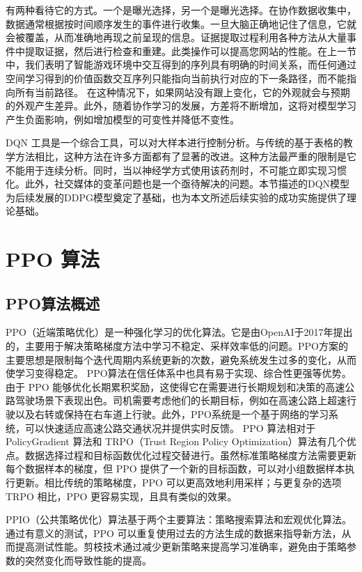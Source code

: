 有两种看待它的方式。一个是曝光选择，另一个是曝光选择。在协作数据收集中，数据通常根据按时间顺序发生的事件进行收集。一旦大脑正确地记住了信息，它就会被覆盖，从而准确地再现之前呈现的信息。证据提取过程利用各种方法从大量事件中提取证据，然后进行检查和重建。此类操作可以提高您网站的性能。在上一节中，我们表明了智能游戏环境中交互得到的序列具有明确的时间关系，而任何通过空间学习得到的价值函数交互序列只能指向当前执行对应的下一条路径，而不能指向所有当前路径。
在这种情况下，如果网站没有跟上变化，它的外观就会与预期的外观产生差异。此外，随着协作学习的发展，方差将不断增加，这将对模型学习产生负面影响，例如增加模型的可变性并降低不变性。

DQN 工具是一个综合工具，可以对大样本进行控制分析。与传统的基于表格的教学方法相比，这种方法在许多方面都有了显著的改进。这种方法最严重的限制是它不能用于连续分析。同时，当以神经学方式使用该药剂时，不可能立即实现习惯化。此外，社交媒体的变革问题也是一个亟待解决的问题。本节描述的DQN模型为后续发展的DDPG模型奠定了基础，也为本文所述后续实验的成功实施提供了理论基础。

\section{PPO 算法}

\subsection{PPO算法概述 }

PPO（近端策略优化）是一种强化学习的优化算法。它是由OpenAI于2017年提出的，主要用于解决策略梯度方法中学习不稳定、采样效率低的问题。PPO方案的主要思想是限制每个迭代周期内系统更新的次数，避免系统发生过多的变化，从而使学习变得稳定。 PPO算法在信任体系中也具有易于实现、综合性更强等优势\cite{schulman2017proxima}。由于 PPO 能够优化长期累积奖励，这使得它在需要进行长期规划和决策的高速公路驾驶场景下表现出色。司机需要考虑他们的长期目标，例如在高速公路上超速行驶以及右转或保持在右车道上行驶。此外，PPO系统是一个基于网络的学习系统，可以快速适应高速公路交通状况并提供实时反馈。 PPO 算法相对于 PolicyGradient 算法和 TRPO（Trust Region Policy Optimization）算法有几个优点。数据选择过程和目标函数优化过程交替进行。虽然标准策略梯度方法需要更新每个数据样本的梯度，但 PPO 提供了一个新的目标函数，可以对小组数据样本执行更新。相比传统的策略梯度，PPO 可以更高效地利用采样；与更复杂的选项 TRPO 相比，PPO 更容易实现，且具有类似的效果\cite{dey2017gate}。

PPIO（公共策略优化）算法基于两个主要算法：策略搜索算法和宏观优化算法。通过有意义的测试，PPO 可以重复使用过去的方法生成的数据来指导新方法，从而提高测试性能。剪枝技术通过减少更新策略来提高学习准确率，避免由于策略参数的突然变化而导致性能的提高。

